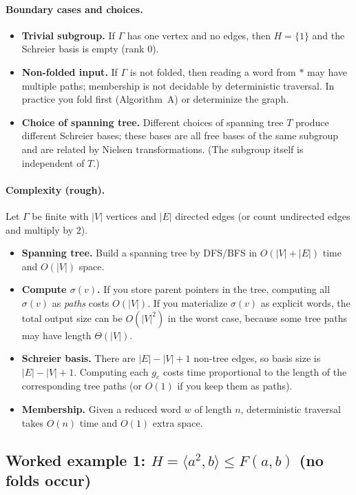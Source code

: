\documentclass[11pt]{article}
\theoremstyle{definition}
\theoremstyle{plain}
\theoremstyle{remark}
\begin{document}
\paragraph{Boundary cases and choices.}
\begin{itemize}[leftmargin=2em]
\item \textbf{Trivial subgroup.} If $\Gamma$ has one vertex and no edges, then $H=\{1\}$ and the Schreier basis is empty (rank $0$).
\item \textbf{Non-folded input.} If $\Gamma$ is not folded, then reading a word from $*$ may have multiple paths; membership is not decidable by deterministic traversal. In practice you fold first (Algorithm~A) or determinize the graph.
\item \textbf{Choice of spanning tree.} Different choices of spanning tree $T$ produce different Schreier bases; these bases are all free bases of the same subgroup and are related by Nielsen transformations. (The subgroup itself is independent of $T$.)
\end{itemize}

\paragraph{Complexity (rough).}\cite{stallings1983,schreier1927,cormen2009}
Let $\Gamma$ be finite with $|V|$ vertices and $|E|$ directed edges (or count undirected edges and multiply by $2$).
\begin{itemize}[leftmargin=2em]
\item \textbf{Spanning tree.} Build a spanning tree by DFS/BFS in $O(|V|+|E|)$ time and $O(|V|)$ space.
\item \textbf{Compute $\sigma(v)$.} If you store parent pointers in the tree, computing all $\sigma(v)$ as \emph{paths} costs $O(|V|)$.
If you materialize $\sigma(v)$ as explicit words, the total output size can be $O(|V|^2)$ in the worst case, because some tree paths may have length $\Theta(|V|)$.
\item \textbf{Schreier basis.} There are $|E|-|V|+1$ non-tree edges, so basis size is $|E|-|V|+1$.
Computing each $g_e$ costs time proportional to the length of the corresponding tree paths (or $O(1)$ if you keep them as paths).
\item \textbf{Membership.} Given a reduced word $w$ of length $n$, deterministic traversal takes $O(n)$ time and $O(1)$ extra space.
\end{itemize}
\subsection*{Worked example 1: $H=\langle a^2,b\rangle\le F(a,b)$ (no folds occur)}
\end{document}
